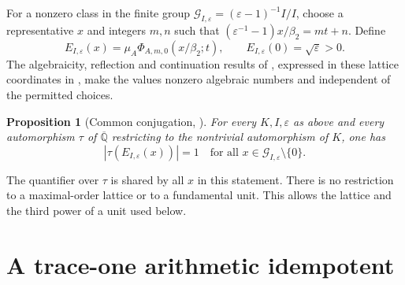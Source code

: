 \documentclass[11pt]{article}
\newtheorem{proposition}[theorem]{Proposition}
\newcommand{\Qbar}{\overline{\mathbb Q}}
\begin{document}
For a nonzero class in the finite group
$\mathcal G_{I,\varepsilon}=(\varepsilon-1)^{-1}I/I$, choose a representative
$x$ and integers $m,n$ such that
$(\varepsilon^{-1}-1)x/\beta_2=mt+n$. Define
\begin{equation}
\label{eq:E}
 E_{I,\varepsilon}(x)=\mu_A\Phi_{A,m,0}(x/\beta_2;t),
 \qquad E_{I,\varepsilon}(0)=\sqrt\varepsilon>0.
\end{equation}
The algebraicity, reflection and continuation results of
\cite[Theorems~1--2]{RW26}, expressed in these lattice coordinates in
\cite[Section~3 and Appendix~B]{REC26}, make the values nonzero algebraic
numbers and independent of the permitted choices.

\begin{proposition}[Common conjugation, {\cite[Proposition~7]{REC26}}]
\label{prop:common}
For every $K,I,\varepsilon$ as above and every automorphism $\tau$ of $\Qbar$
restricting to the nontrivial automorphism of $K$, one has
\begin{equation}
\label{eq:common}
 |\tau(E_{I,\varepsilon}(x))|=1
 \quad\text{for all }x\in\mathcal G_{I,\varepsilon}\setminus\{0\}.
\end{equation}
\end{proposition}

The quantifier over $\tau$ is shared by all $x$ in this statement. There is
no restriction to a maximal-order lattice or to a fundamental unit. This
allows the lattice and the third power of a unit used below.

\section{A trace-one arithmetic idempotent}
\label{sec:ghost}
\end{document}
